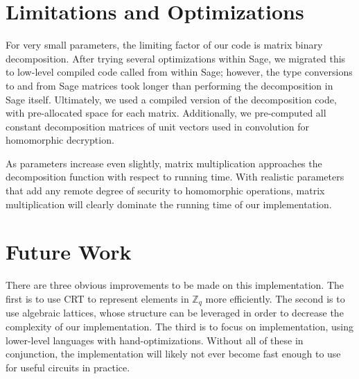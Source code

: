 \documentclass{article}
\begin{document}
\section{Limitations and Optimizations}

For very small parameters, the limiting factor of our code is matrix binary
decomposition. After trying several optimizations within Sage, we migrated
this to low-level compiled code called from within Sage; however, the type 
conversions to and from Sage matrices took longer than performing the 
decomposition in Sage itself. Ultimately, we used a compiled version of the 
decomposition code, with pre-allocated space for each matrix. Additionally,
we pre-computed all constant decomposition matrices of unit vectors used in
convolution for homomorphic decryption.

As parameters increase even slightly, matrix multiplication approaches the 
decomposition function with respect to running time. With realistic parameters
that add any remote degree of security to homomorphic operations, matrix 
multiplication will clearly dominate the running time of our implementation.

\section{Future Work}

There are three obvious improvements to be made on this implementation. The first is
to use CRT to represent elements in $\mathbb{Z}_q$ more efficiently. The second
is to use algebraic lattices, whose structure can be leveraged in order to
decrease the complexity of our implementation. The third is to focus on
implementation, using lower-level languages with hand-optimizations. Without
all of these in conjunction, the implementation will likely not ever become
fast enough to use for useful circuits in practice. 
\end{document}
